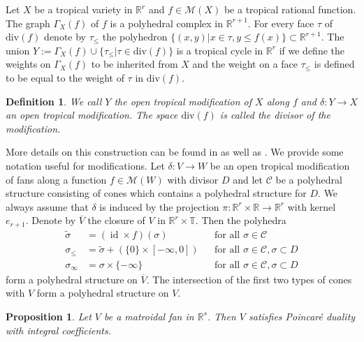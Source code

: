 \documentclass[11pt]{article}
\numberwithin{equation}{numsection}
\newcommand{\CC}{{\mathcal C}}
\newcommand{\R}{{\mathbb R}}
\newcommand{\T}{{\mathbb T}}
\newcommand{\MS}{\mathcal{M}}
\renewcommand{\div}{\mathrm{div}}
\newcommand{\lift}[1]{\widetilde{#1}}
\newcommand{\bdry}[1]{#1_\infty}
\newcommand{\down}[1]{#1_\leq}
\DeclareMathOperator{\id}{id}
\newtheorem{defn}[thm]{Definition}
\newtheorem{prop}[thm]{Proposition}
\begin{document}
Let $X$ be a tropical variety in $\R^r$ and $f \in \MS(X)$ be a tropical rational function. 
The graph $\Gamma_X(f)$ of $f$ is a polyhedral complex in $\R^{r+1}$. 
For every face $\tau$ of $\div(f)$ denote by $\tau_\leq$ the polyhedron 
$\{ (x,y) \vert x \in \tau, y \leq f(x)\} \subset \R^{r+1}$. 
The union $Y := \Gamma_X(f) \cup \{ \tau_\leq \vert \tau \in \div(f) \}$ is a tropical cycle in $\R^r$ if we define
the weights on $\Gamma_X(f)$ to be inherited from $X$ and the weight on a face  $\tau_\leq$ is defined to be  equal to the weight of  $\tau$ in $\div(f)$. 

\begin{defn}
We call $Y$ the \emph{open tropical modification of $X$ along $f$} and 
$\delta \colon Y \to X$ an \emph{open tropical modification}. 
The space $\div(f)$ is called the \emph{divisor} of the modification. 
\end{defn}


More details on this construction can be found in \cite[Construction 3.3]{AllermannRau} as well as \cite[Chapter 5]{MikRau}.
We provide some notation useful for modifications.  
Let $\delta \colon V \to W$ be an open tropical modification of fans along a function $f \in \MS(W)$ with divisor $D$ and 
let $\CC$ be a polyhedral structure consisting of cones which contains a polyhedral structure for $D$. 
We always assume that $\delta$ is induced by the projection $\pi \colon \R^r \times \R \to \R^r$
with kernel $e_{r+1}$. 
Denote by $\overline{V}$ the closure of $V$ in $\R^r \times \T$. 
Then the polyhedra
\begin{align} \label{modification structure}
  \lift{\sigma} &= (\id \times f)(\sigma) & & \text{for all } \sigma \in \CC \nonumber \\
  \down{\sigma} &= \lift{\sigma} + (\{0\} \times [-\infty, 0]) & & \text{for all } \sigma \in \CC, \sigma \subset D  \\  
  \bdry{\sigma} &= \sigma \times \{-\infty\} & & \text{for all } \sigma \in \CC, \sigma \subset D \nonumber 
\end{align}
form a polyhedral structure on $\overline{V}$. The intersection of the first two types of cones with $V$  form a polyhedral structure 
on $V$.  


\begin{prop}\label{prop:pdmatZ2}
Let $V$ be a  matroidal fan  in $\R^s$.
Then $V$ satisfies Poincar\'e duality with integral coefficients. 
\end{prop}
\end{document}

